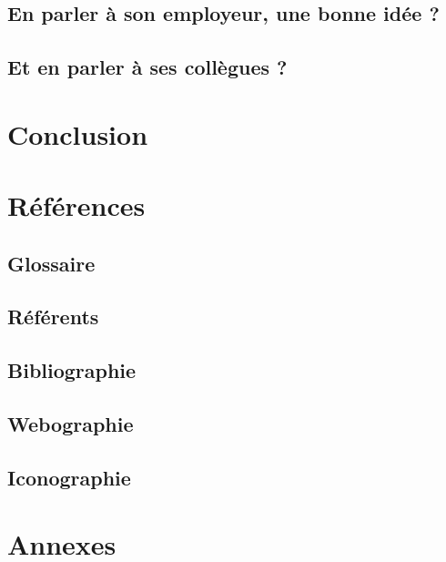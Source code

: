 \documentclass[a4paper, 11pt]{report}
\begin{document}
\subsection{En parler à son employeur, une bonne idée ?}

\subsection{Et en parler à ses collègues ?}

\clearpage

\section{Conclusion}

\clearpage

\section{Références}

\subsection{Glossaire}


\subsection{Référents}


\subsection{Bibliographie}


\subsection{Webographie}


\subsection{Iconographie}


\section{Annexes}

\end{document}
